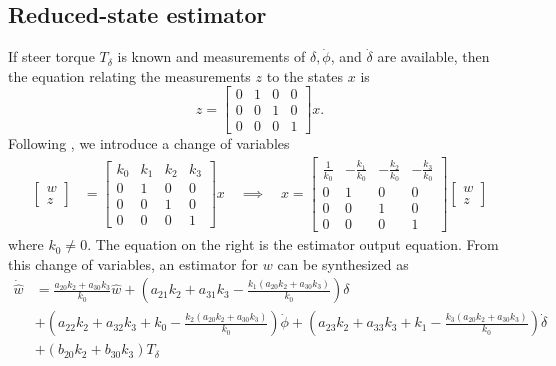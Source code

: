 \documentclass[letterpaper,11pt]{article}
\begin{document}
\subsection{Reduced-state estimator} \label{reducedstate}
If steer torque $T_\delta$ is known and measurements of $\delta, \dot{\phi}$,
and $\dot{\delta}$ are available, then the equation relating the measurements
$z$ to the states $x$ is
\begin{equation*}
z = \left[\begin{smallmatrix}0 & 1 & 0 & 0\\ 0 & 0 & 1 & 0\\ 0 & 0 & 0 &
1\end{smallmatrix}\right] x.
\end{equation*}
Following \cite{Bryson1970}, we introduce a change of variables
\begin{align}
\left[\begin{smallmatrix}w \\ z\end{smallmatrix}\right] &=
\left[\begin{smallmatrix}k_0 & k_1 & k_2 & k_3 \\ 0 & 1 & 0 & 0\\ 0 & 0 & 1 & 0\\ 0 & 0 & 0 &
1\end{smallmatrix}\right] x  \quad\implies\quad
x =
\left[\begin{smallmatrix}\frac{1}{k_{0}} & - \frac{k_{1}}{k_{0}} & -
  \frac{k_{2}}{k_{0}} & - \frac{k_{3}}{k_{0}}\\0 & 1 & 0 & 0\\0 & 0 & 1 & 0\\0
  & 0 & 0 & 1\end{smallmatrix}\right]\left[\begin{smallmatrix} w \\ z\end{smallmatrix}\right]
\label{eq:cov}
\end{align}
where $k_0\ne0$. The equation on the right is the estimator output equation.
From this change of variables, an estimator for $w$ can be synthesized as
\begin{align*}
\dot{\hat{w}} &= \frac{a_{20} k_{2} + a_{30} k_{3}}{k_{0}} \hat{w}
 + \left(a_{21} k_{2} + a_{31} k_{3} - \frac{k_{1} \left(a_{20} k_{2} + a_{30} k_{3}\right)}{k_{0}}\right) \delta \\
 &+ \left(a_{22} k_{2} + a_{32} k_{3} + k_{0} - \frac{k_{2} \left(a_{20} k_{2} + a_{30} k_{3}\right)}{k_{0}}\right) \dot{\phi}
 + \left(a_{23} k_{2} + a_{33} k_{3} + k_{1} - \frac{k_{3} \left(a_{20} k_{2} + a_{30} k_{3}\right)}{k_{0}}\right) \dot{\delta} \\
 &+ \left(b_{20} k_{2} + b_{30} k_{3}\right) T_\delta
\end{align*}
\end{document}
